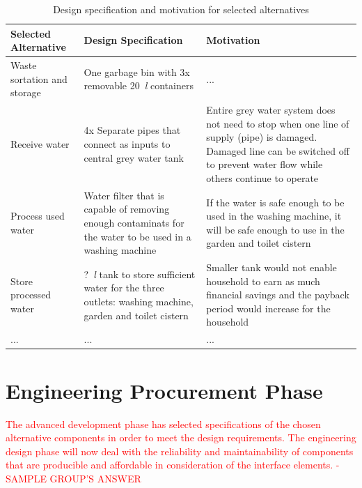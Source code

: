 \documentclass[a4paper,11pt,fleqn]{report}
\begin{document}
\begin{table}[h!]
\caption {Design specification and motivation for selected alternatives} \label{tb: Functional_SS_elements} 
\begin{center}
\begin{tabular}{p{4.5cm}|p{4.5cm}|p{4.5cm}}\toprule
	{\textbf{Selected Alternative}} & {\textbf{Design Specification}} & {\textbf{Motivation}}\\ \midrule
    \hline
    Waste sortation and storage & One garbage bin with 3x removable 20~\textit{l} containers& ...\\
        \hline
    Receive water & 4x Separate pipes that connect as inputs to central grey water tank & Entire grey water system does not need to stop when one line of supply (pipe) is damaged. Damaged line can be switched off to prevent water flow while others continue to operate\\
        \hline
    Process used water & Water filter that is capable of removing enough contaminats for the water to be used in a washing machine & If the water is safe enough to be used in the washing machine, it will be safe enough to use in the garden and toilet cistern \\
        \hline
    Store processed water & ?~\textit{l} tank to store sufficient water for the three outlets: washing machine, garden and toilet cistern & Smaller tank would not enable household to earn as much financial savings and the payback period would increase for the household\\
        \hline
    ... & ... & ...\\

    \bottomrule
\end{tabular}
\end{center}
\end{table}
%
\section{Engineering Procurement Phase}
\textcolor{red}{The advanced development phase has selected specifications of the chosen alternative components in order to meet the design requirements. The engineering design phase will now deal with the reliability and maintainability of components that are producible and affordable in consideration of the interface elements. - SAMPLE GROUP'S ANSWER}
\end{document}
